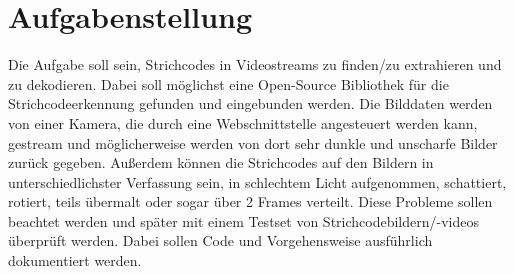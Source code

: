 \section{Aufgabenstellung}
Die Aufgabe soll sein, Strichcodes in Videostreams zu finden/zu extrahieren und zu dekodieren. Dabei soll möglichst eine Open-Source Bibliothek für die Strichcodeerkennung gefunden und eingebunden werden.
Die Bilddaten werden von einer Kamera, die durch eine Webschnittstelle angesteuert werden kann, gestream und möglicherweise werden von dort sehr dunkle und unscharfe Bilder zurück gegeben. Außerdem können die Strichcodes auf den Bildern in unterschiedlichster Verfassung sein, in schlechtem Licht aufgenommen, schattiert, rotiert, teils übermalt oder sogar über 2 Frames verteilt.
Diese Probleme sollen beachtet werden und später mit einem Testset von Strichcodebildern/-videos überprüft werden.
Dabei sollen Code und Vorgehensweise ausführlich dokumentiert werden.